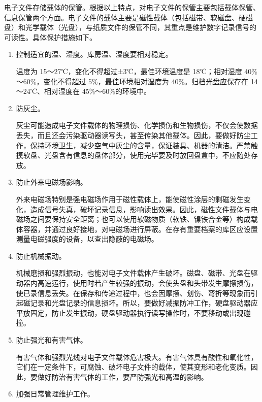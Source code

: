 \begin{enumerate.zh}
    \item 电子文件存储载体的保管。根据以上特点，对电子文件的保管主要包括载体保管、信息保管两个方面。电子文件的载体主要是磁性载体（包括磁带、软磁盘、硬磁盘）和光学载体（光盘），与纸质文件的保管不同，其重点是维护数字记录信号的可读性。具体保护措施如下。
        \begin{enumerate}
            \item  控制适宜的温、湿度。库房温、湿度要相对稳定。

            温度为 15～27℃，变化不得超过±3℃，最佳环境温度是 18℃；相对湿度 40\%～60\%，变化不得超过 5\%，最佳环境相对湿度为 40\%。归档光盘应保存在 14～24℃、相对湿度在 45\%～60\%的环境中。

            \item  防灰尘。

            灰尘可能造成电子文件载体的物理损伤、化学损伤和生物损伤，不仅会使数据丢失，而且还会污染驱动器读写头，甚至传染其他载体。因此，要做好防尘工作，保持环境卫生，减少空气中灰尘的含量，保证装具、机器的清洁。严禁触摸软盘、光盘含有信息的盘体部分，使用完毕要及时放回盘盒中，不应随处存放。

            \item  防止外来电磁场影响。

            外来电磁场特别是强电磁场作用于磁性载体上，能使磁性涂层的剩磁发生变化，造成信号失真，破坏记录信息，影响读出效果。因此，磁性文件载体与电磁场之间要保持安全距离；也可以使用软磁物质（软铁、镍铁合金等）构成载体容器，并通过良好接地，对电磁场进行屏蔽。在存有重要档案的库区应设置测量电磁强度的设备，以查出隐蔽的电磁场。

            \item  防止机械振动。

            机械磨损和强烈振动，也能对电子文件载体产生破坏。磁盘、磁带、光盘在驱动器内高速运行，使用时若产生较强的振动，会使头盘和头带发生摩擦损伤，使已录信息丢失。在保存和传递过程中，也会因摩擦、划伤、弯折等现象而引起磁记录和光盘记录的信息损坏。所以，要做好减振防冲工作，硬盘驱动器应平放固定，防止发生振动，硬盘驱动器执行读写操作时，不要移动或出现碰撞。

            \item  防止强光和有害气体。

            有害气体和强烈光线对电子文件载体危害极大。有害气体具有酸性和氧化性，它们在一定条件下，可腐蚀、破坏电子文件的载体，使其变形和老化变质。因此，要做好防治有害气体的工作，要严防强光和高温的影响。

            \item  加强日常管理维护工作。
        \end{enumerate}


\end{enumerate.zh}
